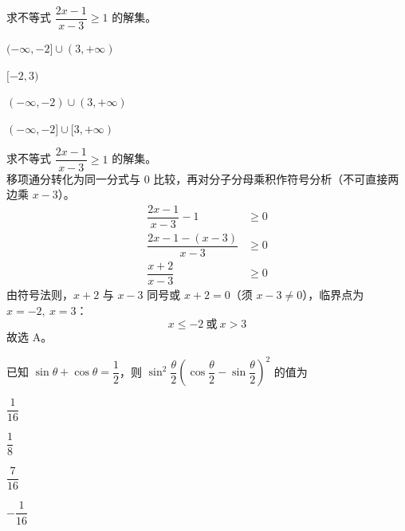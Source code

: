 \documentclass[12pt,a4paper]{exam-zh}
\begin{document}
\begin{question}
    求不等式 $\dfrac{2x-1}{x-3}\geq1$ 的解集。 \paren[A]
    \begin{choices}[columns=2,linesep=0pt]
        \item $(-\infty,-2]\cup(3,+\infty)$
        \item $[-2,3)$
        \item $(-\infty,-2)\cup(3,+\infty)$
        \item $(-\infty,-2]\cup[3,+\infty)$
    \end{choices}
\end{question}

\begin{solution}
    求不等式 $\dfrac{2x-1}{x-3}\geq1$ 的解集。\\
    移项通分转化为同一分式与 $0$ 比较，再对分子分母乘积作符号分析（不可直接两边乘 $x-3$）。
    \begin{align*}
        \dfrac{2x-1}{x-3}-1 &\geq0 \\
        \dfrac{2x-1-(x-3)}{x-3} &\geq0 \\
        \dfrac{x+2}{x-3} &\geq0
    \end{align*}
    由符号法则，$x+2$ 与 $x-3$ 同号或 $x+2=0$（须 $x-3\neq0$），临界点为 $x=-2,\ x=3$：
    \[
        x\leq-2 \ \text{或} \ x>3
    \]
    故选 A。
\end{solution}

\begin{question}
    已知 $\sin\theta+\cos\theta=\dfrac{1}{2}$，则 $\sin^{2}\dfrac{\theta}{2}\left(\cos\dfrac{\theta}{2}-\sin\dfrac{\theta}{2}\right)^{2}$ 的值为 \paren[A]
    \begin{choices}
        \item $\dfrac{1}{16}$
        \item $\dfrac{1}{8}$
        \item $\dfrac{7}{16}$
        \item $-\dfrac{1}{16}$
    \end{choices}
\end{question}
\end{document}
